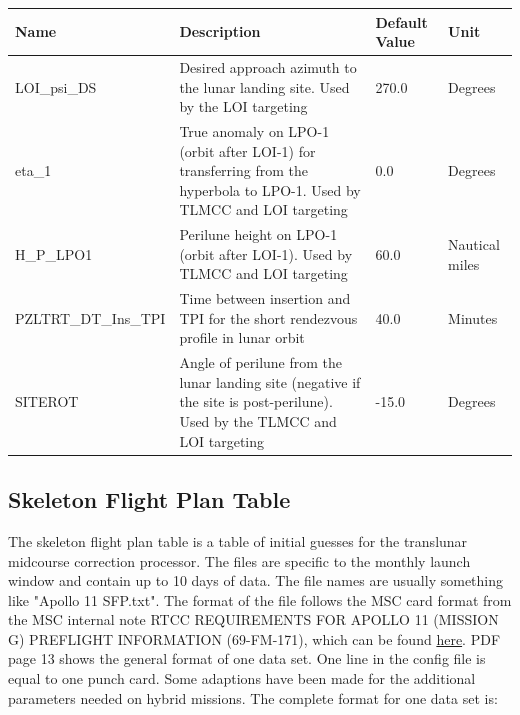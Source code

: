 \documentclass[11pt]{article} %
\begin{document}
\begin{tabular}{L{3.7cm} L{7cm} L{1.95cm} L{1.5cm}}
\hline
\textbf{Name} & \textbf{Description} & \textbf{Default Value} & \textbf{Unit}\\
\hline
LOI\_psi\_DS & Desired approach azimuth to the lunar landing site. Used by the LOI targeting & 270.0 & Degrees\\
\hline
eta\_1 & True anomaly on LPO-1 (orbit after LOI-1) for transferring from the hyperbola to LPO-1. Used by TLMCC and LOI targeting & 0.0 & Degrees\\
\hline
H\_P\_LPO1 & Perilune height on LPO-1 (orbit after LOI-1). Used by TLMCC and LOI targeting & 60.0 & Nautical miles\\
\hline
PZLTRT\_DT\_Ins\_TPI & Time between insertion and TPI for the short rendezvous profile in lunar orbit & 40.0 & Minutes\\
\hline
SITEROT & Angle of perilune from the lunar landing site (negative if the site is post-perilune). Used by the TLMCC and LOI targeting & -15.0 & Degrees\\
\end{tabular}

\newpage
\subsection{Skeleton Flight Plan Table}

The skeleton flight plan table is a table of initial guesses for the translunar midcourse correction processor. The files are specific to the monthly launch window and contain up to 10 days of data. The file names are usually something like "Apollo 11 SFP.txt". The format of the file follows the MSC card format from the MSC internal note RTCC REQUIREMENTS FOR APOLLO 11 (MISSION G) PREFLIGHT INFORMATION (69-FM-171), which can be found \href{https://web.archive.org/web/20100524010957/http://ntrs.nasa.gov/archive/nasa/casi.ntrs.nasa.gov/19740072570_1974072570.pdf}{here}. PDF page 13 shows the general format of one data set. One line in the config file is equal to one punch card. Some adaptions have been made for the additional parameters needed on hybrid missions. The complete format for one data set is:\\
\end{document}
